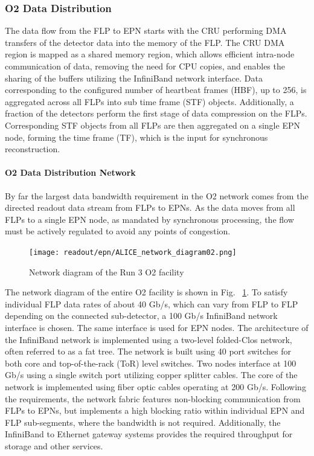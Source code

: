 \subsubsection{O2 Data Distribution}

The data flow from the FLP to EPN starts with the CRU performing DMA transfers of the detector data into the memory of the FLP. 
The CRU DMA region is mapped as a shared memory region, which allows efficient intra-node communication of data, removing the need for CPU copies, and enables the sharing of the buffers utilizing the InfiniBand network interface. 
Data corresponding to the configured number of heartbeat frames (HBF), up to 256, is aggregated across all FLPs into sub time frame (STF) objects. 
Additionally, a fraction of the detectors perform the first stage of data compression on the FLPs. 
Corresponding STF objects from all FLPs are then aggregated on a single EPN node, forming the time frame (TF), which is the input for synchronous reconstruction.

\paragraph{O2 Data Distribution Network}

By far the largest data bandwidth requirement in the O2 network comes from the directed readout data stream from FLPs to EPNs. 
As the data moves from all FLPs to a single EPN node, as mandated by synchronous processing, the flow must be actively regulated to avoid any points of congestion.

\begin{figure}[ht]
\centering
\texttt{[image: readout/epn/ALICE\_network\_diagram02.png]}
\caption{Network diagram of the Run 3 O2 facility}
\label{fig:alice_network}
\end{figure}

The network diagram of the entire O2 facility is shown in Fig. ~\ref{fig:alice_network}.
To satisfy individual FLP data rates of about 40 Gb/s, which can vary from FLP to FLP depending on the connected sub-detector, a 100 Gb/s InfiniBand network interface is chosen. 
The same interface is used for EPN nodes. 
The architecture of the InfiniBand network is implemented using a two-level folded-Clos network, often referred to as a fat tree. 
The network is built using 40 port switches for both core and top-of-the-rack (ToR) level switches. 
Two nodes interface at 100 Gb/s using a single switch port utilizing copper splitter cables. 
The core of the network is implemented using fiber optic cables operating at 200 Gb/s. 
Following the requirements, the network fabric features non-blocking communication from FLPs to EPNs, but implements a high blocking ratio within individual EPN and FLP sub-segments, where the bandwidth is not required. 
Additionally, the InfiniBand to Ethernet gateway systems provides the required throughput for storage and other services.

